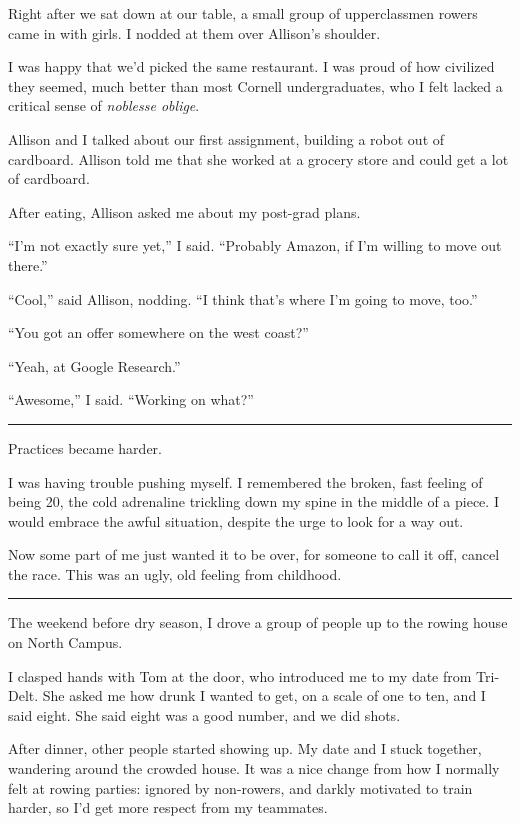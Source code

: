 Right after we sat down at our table, a small group of upperclassmen
rowers came in with girls.  I nodded at them over Allison's shoulder.  

I was happy that we'd picked the same restaurant.  I was proud of how civilized
they seemed, much better than most Cornell undergraduates, who I felt
lacked a critical sense of \textit{noblesse oblige}.

Allison and I talked about our first assignment, building a robot out of
cardboard.  Allison told me that she worked at a grocery store and could get a
lot of cardboard.  

After eating, Allison asked me about my post-grad plans.  

``I'm not exactly sure yet,'' I said.  ``Probably Amazon, if I'm willing to move
out there.''

``Cool,'' said Allison, nodding.  ``I think that's where I'm going to move,
too.''

``You got an offer somewhere on the west coast?''

``Yeah, at Google Research.''

``Awesome,'' I said.  ``Working on what?''

\plainfancybreak{12pt}{2}{* * *}


Practices became harder.

I was having trouble pushing myself.  I remembered the broken, fast feeling of
being 20, the cold adrenaline trickling down my spine in the middle of a piece.
I would embrace the awful situation, despite the urge to look for a way out.  

Now some part of me just wanted it to be over, for someone to call it off,
cancel the race.  This was an ugly, old feeling from childhood.

\plainfancybreak{12pt}{2}{}

The weekend before dry season, I drove a group of people up to the rowing house
on North Campus.

I clasped hands with Tom at the door, who introduced me to my date from
Tri-Delt.  She asked me how drunk I wanted to get, on a scale of one to ten, and
I said eight.  She said eight was a good number, and we did shots.  

After dinner, other people started showing up.  My date and I stuck together,
wandering around the crowded house.  It was a nice change from how I normally
felt at rowing parties: ignored by non-rowers, and darkly motivated to train
harder, so I'd get more respect from my teammates.

